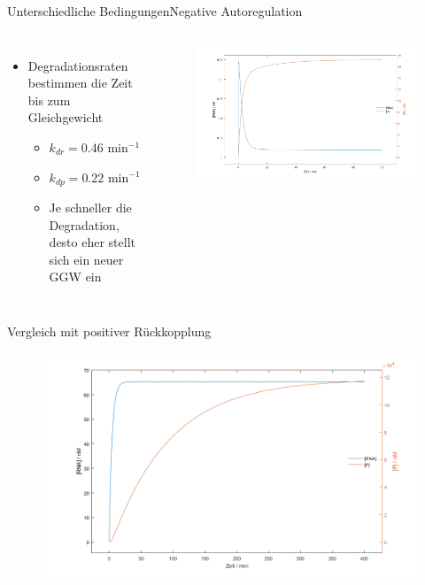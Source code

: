 \documentclass[11pt,aspectratio=169,reqno]{beamer}
\begin{document}
\begin{frame}{Unterschiedliche Bedingungen\hfill {\small Negative Autoregulation}}
    \begin{columns}
        \begin{itemize}
            \item Degradationsraten bestimmen die Zeit bis zum Gleichgewicht
            \begin{itemize}
                \item $k_{dr}=0.46\text{ min$^{-1}$}$
                \item $k_{dp}=0.22\text{ min$^{-1}$}$
                \item Je schneller die Degradation, desto eher stellt sich ein neuer GGW ein
            \end{itemize}
        \end{itemize}
        
        \begin{figure}
            \centering
            \includegraphics[width=\linewidth]{images/simulations/negative_autoregulation_quicker_degradation.m.png}
        \end{figure}
    \end{columns}
\end{frame}

\begin{frame}{Vergleich mit positiver Rückkopplung}
\begin{figure}
    \centering
    \includegraphics[width=\textwidth]{images/simulations/positive_autoregulation_basic.m.png}
\end{figure}
\end{frame}
\end{document}
